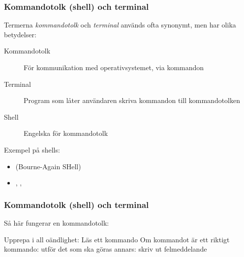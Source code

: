 




\begin{frame}[fragile=singleslide]
    \frametitle{Kommandotolk (shell) och terminal}

    Termerna \emph{kommandotolk} och \emph{terminal} används ofta synonymt, men har olika betydelser:
    \halfblankline

    \begin{description}
        \item [Kommandotolk] För kommunikation med operativsystemet, via kommandon
        \item [Terminal] Program som låter användaren skriva kommandon till kommandotolken
        \item [Shell] Engelska för kommandotolk
    \end{description}

    \blankline
    
    Exempel på shells:
    \begin{itemize}
        \item {} (Bourne-Again SHell)
        \item {}, , 
    \end{itemize}

\end{frame}

\begin{frame}[fragile=singleslide]
    \frametitle{Kommandotolk (shell) och terminal}

    Så här fungerar en kommandotolk:
    \begin{GobbleCode}{4}
        Upprepa i all oändlighet:
            Läs ett kommando
            Om kommandot är ett riktigt kommando:
                utför det som ska göras
            annars:
                skriv ut felmeddelande
    \end{GobbleCode}

\end{frame}

